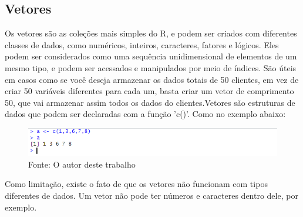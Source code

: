    \subsection{Vetores}
    		Os vetores são as coleções mais simples do R, e podem ser criados com diferentes classes de dados, como numéricos, inteiros, caracteres, fatores e lógicos. Eles podem ser considerados como uma sequência unidimensional de elementos de um mesmo tipo, e podem ser acessados e manipulados por meio de índices. São úteis em casos como se você deseja armazenar os dados totais de 50 clientes, em vez de criar 50 variáveis diferentes para cada um, basta criar um vetor de comprimento 50, que vai armazenar assim todos os dados do clientes.Vetores são estruturas de dados que podem ser declaradas com a função 'c()'. Como no exemplo abaixo:\begin{figure}[H]
    			\centering
    			\caption{}
    			\includegraphics[width=1.0\linewidth]{Prints/screenshot003}
    			\label{fig:screenshot003}
    			{\tiny \sf Fonte: O autor deste trabalho }
    		\end{figure}
    		
    		Como limitação, existe o fato de que os vetores não funcionam com tipos diferentes de dados. Um vetor não pode ter números e caracteres dentro dele, por exemplo.

